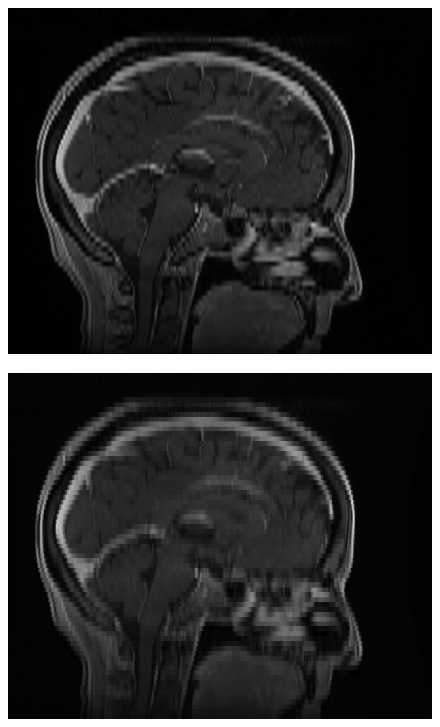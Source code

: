 \documentclass[fleqn,a4paper,oneside,openany]{book}
\begin{document}
\begin{figure}
\begin{minipage}[b]{140pt}
     \label{fig:radiomics_filter_2mm_high_pass}
     \hspace{100pt}
   \end{minipage}
   \begin{minipage}[b]{140pt}
     \centering
     \includegraphics[trim = 0 0 0 0, clip, scale=0.38]{radiomics_filtering/filtered_image_3mm_spacing_none.png}
     \label{fig:radiomics_filter_3mm_original}
     \hspace{100pt}
   \end{minipage}
   \begin{minipage}[b]{140pt}
     \centering
     \includegraphics[trim = 0 0 0 0, clip, scale=0.38]{radiomics_filtering/filtered_image_3mm_spacing_lo.png}

\end{minipage}
\end{figure}
\end{document}

